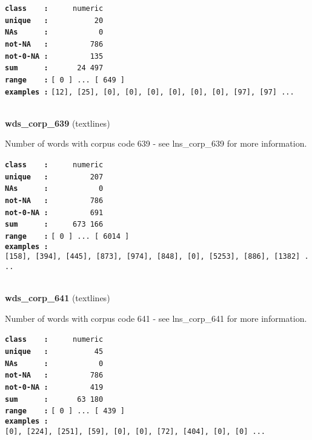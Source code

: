 \documentclass[]{article}
\begin{document}
\textbf{\texttt{class\ \ \ \ :}} \texttt{~~~~~numeric}\\
\textbf{\texttt{unique\ \ \ :}} \texttt{~~~~~~~~~~20}\\
\textbf{\texttt{NAs\ \ \ \ \ \ :}} \texttt{~~~~~~~~~~~0}\\
\textbf{\texttt{not-NA\ \ \ :}} \texttt{~~~~~~~~~786}\\
\textbf{\texttt{not-0-NA\ :}} \texttt{~~~~~~~~~135}\\
\textbf{\texttt{sum\ \ \ \ \ \ :}} \texttt{~~~~~~24~497}\\
\textbf{\texttt{range\ \ \ \ :}}
\texttt{{[}\ 0\ {]}\ ...\ {[}\ 649\ {]}}\\
\textbf{\texttt{examples\ :}}
\texttt{{[}12{]},\ {[}25{]},\ {[}0{]},\ {[}0{]},\ {[}0{]},\ {[}0{]},\ {[}0{]},\ {[}0{]},\ {[}97{]},\ {[}97{]}\ ...}\\

~

\textbf{wds\_corp\_639} (textlines)

Number of words with corpus code 639 - see lns\_corp\_639 for more
information.

\textbf{\texttt{class\ \ \ \ :}} \texttt{~~~~~numeric}\\
\textbf{\texttt{unique\ \ \ :}} \texttt{~~~~~~~~~207}\\
\textbf{\texttt{NAs\ \ \ \ \ \ :}} \texttt{~~~~~~~~~~~0}\\
\textbf{\texttt{not-NA\ \ \ :}} \texttt{~~~~~~~~~786}\\
\textbf{\texttt{not-0-NA\ :}} \texttt{~~~~~~~~~691}\\
\textbf{\texttt{sum\ \ \ \ \ \ :}} \texttt{~~~~~673~166}\\
\textbf{\texttt{range\ \ \ \ :}}
\texttt{{[}\ 0\ {]}\ ...\ {[}\ 6014\ {]}}\\
\textbf{\texttt{examples\ :}}
\texttt{{[}158{]},\ {[}394{]},\ {[}445{]},\ {[}873{]},\ {[}974{]},\ {[}848{]},\ {[}0{]},\ {[}5253{]},\ {[}886{]},\ {[}1382{]}\ ...}\\

~

\textbf{wds\_corp\_641} (textlines)

Number of words with corpus code 641 - see lns\_corp\_641 for more
information.

\textbf{\texttt{class\ \ \ \ :}} \texttt{~~~~~numeric}\\
\textbf{\texttt{unique\ \ \ :}} \texttt{~~~~~~~~~~45}\\
\textbf{\texttt{NAs\ \ \ \ \ \ :}} \texttt{~~~~~~~~~~~0}\\
\textbf{\texttt{not-NA\ \ \ :}} \texttt{~~~~~~~~~786}\\
\textbf{\texttt{not-0-NA\ :}} \texttt{~~~~~~~~~419}\\
\textbf{\texttt{sum\ \ \ \ \ \ :}} \texttt{~~~~~~63~180}\\
\textbf{\texttt{range\ \ \ \ :}}
\texttt{{[}\ 0\ {]}\ ...\ {[}\ 439\ {]}}\\
\textbf{\texttt{examples\ :}}
\texttt{{[}0{]},\ {[}224{]},\ {[}251{]},\ {[}59{]},\ {[}0{]},\ {[}0{]},\ {[}72{]},\ {[}404{]},\ {[}0{]},\ {[}0{]}\ ...}\\
\end{document}
